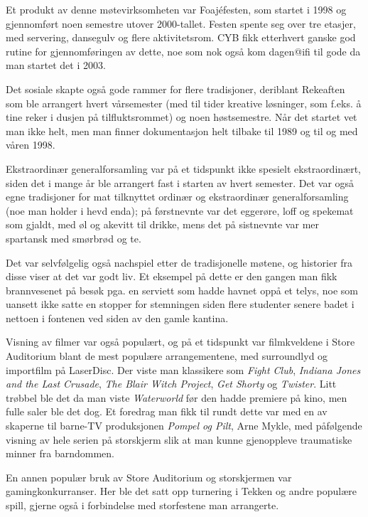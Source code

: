 Et produkt av denne møtevirksomheten var Foajéfesten, som startet i 1998 og gjennomført noen semestre utover 2000-tallet. Festen spente seg over tre etasjer, med servering, dansegulv og flere aktivitetsrom. CYB fikk etterhvert ganske god rutine for gjennomføringen av dette, noe som nok også kom dagen@ifi til gode da man startet det i 2003.

Det sosiale skapte også gode rammer for flere tradisjoner, deriblant Rekeaften som ble arrangert hvert vårsemester (med til tider kreative løsninger, som f.eks. å tine reker i dusjen på tilfluktsrommet) og noen høstsemestre. Når det startet vet man ikke helt, men man finner dokumentasjon helt tilbake til 1989 og til og med våren 1998.

Ekstraordinær generalforsamling var på et tidspunkt ikke spesielt ekstraordinært, siden det i mange år ble arrangert fast i starten av hvert semester. Det var også egne tradisjoner for mat tilknyttet ordinær og ekstraordinær generalforsamling (noe man holder i hevd enda); på førstnevnte var det eggerøre, loff og spekemat som gjaldt, med øl og akevitt til drikke, mens det på sistnevnte var mer spartansk med smørbrød og te.

Det var selvfølgelig også nachspiel etter de tradisjonelle møtene, og historier fra disse viser at det var godt liv. Et eksempel på dette er den gangen man fikk brannvesenet på besøk pga. en serviett som hadde havnet oppå et telys, noe som uansett ikke satte en stopper for stemningen siden flere studenter senere badet i nettoen i fontenen ved siden av den gamle kantina.

Visning av filmer var også populært, og på et tidspunkt var filmkveldene i Store Auditorium blant de mest populære arrangementene, med surroundlyd og importfilm på LaserDisc. Der viste man klassikere som \textit{Fight Club}, \textit{Indiana Jones and the Last Crusade}, \textit{The Blair Witch Project}, \textit{Get Shorty} og \textit{Twister}. Litt trøbbel ble det da man viste \textit{Waterworld} før den hadde premiere på kino, men fulle saler ble det dog. Et foredrag man fikk til rundt dette var med en av skaperne til barne-TV produksjonen \textit{Pompel og Pilt}, Arne Mykle, med påfølgende visning av hele serien på storskjerm slik at man kunne gjenoppleve traumatiske minner fra barndommen.

En annen populær bruk av Store Auditorium og storskjermen var gamingkonkurranser. Her ble det satt opp turnering i Tekken og andre populære spill, gjerne også i forbindelse med storfestene man arrangerte.

